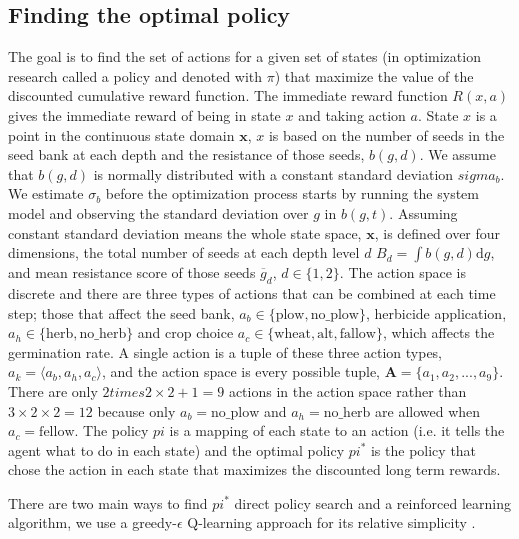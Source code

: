 \documentclass[12pt, a4paper]{article}
\begin{document}
\subsection{Finding the optimal policy}
The goal is to find the set of actions for a given set of states (in optimization research called a policy and denoted with $\pi$) that maximize the value of the discounted cumulative reward function. The immediate reward function $R(x, a)$ gives the immediate reward of being in state $x$ and taking action $a$. State $x$ is a point in the continuous state domain $\mathbf{x}$, $x$ is based on the number of seeds in the seed bank at each depth and the resistance of those seeds, $b(g, d)$. We assume that $b(g, d)$ is normally distributed with a constant standard deviation $sigma_b$. We estimate $\sigma_b$ before the optimization process starts by running the system model and observing the standard deviation over $g$ in $b(g, t)$. Assuming constant standard deviation means the whole state space, $\mathbf{x}$, is defined over four dimensions, the total number of seeds at each depth level $d$ $B_d = \int b(g, d)\text{d}g$, and mean resistance score of those seeds $\overline{g}_d$, $d \in \{1, 2\}$. The action space is discrete and there are three types of actions that can be combined at each time step; those that affect the seed bank, $a_b \in \{\text{plow}, \text{no\_plow}\}$, herbicide application, $a_h \in \{\text{herb}, \text{no\_herb}\}$ and crop choice $a_c \in \{\text{wheat}, \text{alt}, \text{fallow}\}$, which affects the germination rate. A single action is a tuple of these three action types, $a_k = \langle a_b, a_h, a_c \rangle$, and the action space is every possible tuple, $\textbf{A} = \{a_1, a_2, ..., a_{9}\}$. There are only $2 times 2 \times 2 + 1 = 9$ actions in the action space rather than $3 \times 2 \times 2 = 12$ because only $a_b = \text{no\_plow}$ and $a_h = \text{no\_herb}$ are allowed when $a_c = \text{fellow}$. The policy $pi$ is a mapping of each state to an action (i.e. it tells the agent what to do in each state) and the optimal policy $pi^*$ is the policy that chose the action in each state that maximizes the discounted long term rewards. 

There are two main ways to find $pi^*$ direct policy search and a reinforced learning algorithm, we use a greedy-$\epsilon$ Q-learning approach for its relative simplicity \citep{vanH2012}. 
\end{document}
